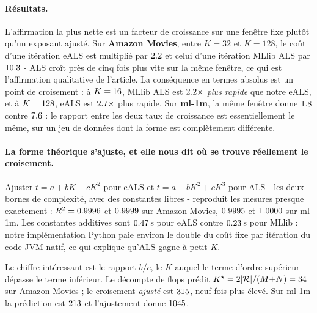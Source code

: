 \paragraph{Résultats.} L'affirmation la plus nette est un facteur de
croissance sur une fenêtre fixe plutôt qu'un exposant ajusté. Sur \textbf{Amazon
Movies}, entre $K=32$ et $K=128$, le coût d'une itération eALS est multiplié par
$2.2$ et celui d'une itération MLlib ALS par $10.3$ - ALS croît
près de cinq fois plus vite sur la même fenêtre, ce qui est l'affirmation qualitative
de l'article. La conséquence en termes absolus est un point de croisement : à
$K=16$, MLlib ALS est $2.2\times$ \emph{plus rapide} que notre
eALS, et à $K=128$, eALS est $2.7\times$ plus rapide. Sur
\textbf{ml-1m}, la même fenêtre donne $1.8$ contre $7.6$ : le
rapport entre les deux taux de croissance est essentiellement le même, sur un jeu de
données dont la forme est complètement différente.

\paragraph{La forme théorique s'ajuste, et elle nous dit où se trouve réellement le
croisement.} Ajuster $t = a + bK + cK^2$ pour eALS et $t = a + bK^2 + cK^3$ pour ALS
- les deux bornes de complexité, avec des constantes libres - reproduit les
mesures presque exactement : $R^2 = 0.9996$ et $0.9999$ sur Amazon
Movies, $0.9995$ et $1.0000$ sur ml-1m. Les constantes additives sont
$0.47$\,s pour eALS contre $0.23$\,s pour MLlib : notre
implémentation Python paie environ le double du coût fixe par itération du code JVM
natif, ce qui explique qu'ALS gagne à petit $K$.

Le chiffre intéressant est le rapport $b/c$, le $K$ auquel le terme d'ordre supérieur
dépasse le terme inférieur. Le décompte de flops prédit
$K^{\star}=2|\mathcal{R}|/(M{+}N)=34$ sur Amazon Movies ; le croisement
\emph{ajusté} est $315$, neuf fois plus élevé. Sur ml-1m la prédiction
est $213$ et l'ajustement donne $1045$.

